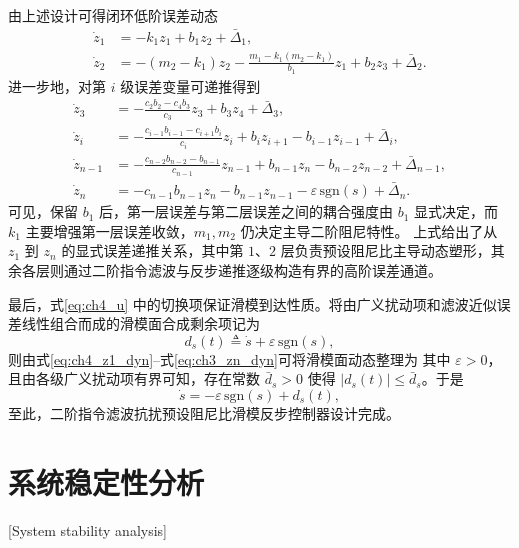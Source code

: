 由上述设计可得闭环低阶误差动态
\begin{subequations}
\begin{align}
\dot z_1 &= -k_1z_1+b_1z_2+\bar\Delta_1, \label{eq:ch4_z1_dyn}\\
\dot z_2 &= -(m_2-k_1)z_2-\frac{m_1-k_1(m_2-k_1)}{b_1}z_1+b_2z_3+\bar\Delta_2. \label{eq:ch4_z2_dyn}
\end{align}
\end{subequations}
进一步地，对第 $i$ 级误差变量可递推得到
\begin{subequations}
\begin{align}
\dot z_3 &= -\frac{c_2b_2-c_4b_3}{c_3}z_3+b_3z_4+\bar\Delta_3, \label{eq:ch3_z3_dyn}\\
\dot z_i &= -\frac{c_{i-1}b_{i-1}-c_{i+1}b_i}{c_i}z_i+b_iz_{i+1}-b_{i-1}z_{i-1}+\bar\Delta_i, \label{eq:ch3_zi_dyn}\\
\dot z_{n-1} &= -\frac{c_{n-2}b_{n-2}-b_{n-1}}{c_{n-1}}z_{n-1}+b_{n-1}z_n-b_{n-2}z_{n-2}+\bar\Delta_{n-1}, \label{eq:ch3_znm1_dyn}\\
\dot z_n &= -c_{n-1}b_{n-1}z_n-b_{n-1}z_{n-1}-\varepsilon\,\mathrm{sgn}(s)+\bar\Delta_n. \label{eq:ch3_zn_dyn}
\end{align}
\end{subequations}
可见，保留 $b_1$ 后，第一层误差与第二层误差之间的耦合强度由 $b_1$ 显式决定，而 $k_1$ 主要增强第一层误差收敛，$m_1,m_2$ 仍决定主导二阶阻尼特性。
上式给出了从 $z_1$ 到 $z_n$ 的显式误差递推关系，其中第 $1$、$2$ 层负责预设阻尼比主导动态塑形，其余各层则通过二阶指令滤波与反步递推逐级构造有界的高阶误差通道。

最后，式\eqref{eq:ch4_u} 中的切换项保证滑模到达性质。将由广义扰动项和滤波近似误差线性组合而成的滑模面合成剩余项记为
\begin{equation}
d_s(t)\triangleq \dot s+\varepsilon\,\mathrm{sgn}(s),
\end{equation}
则由式\eqref{eq:ch4_z1_dyn}--式\eqref{eq:ch3_zn_dyn}可将滑模面动态整理为
其中 $\varepsilon>0$，且由各级广义扰动项有界可知，存在常数 $\bar d_s>0$ 使得 $|d_s(t)|\le \bar d_s$。于是
\begin{equation}\label{eq:ch4_reach}
\dot s=-\varepsilon\,\mathrm{sgn}(s)+d_s(t),
\end{equation}
至此，二阶指令滤波抗扰预设阻尼比滑模反步控制器设计完成。

\section{系统稳定性分析}[System stability analysis]

